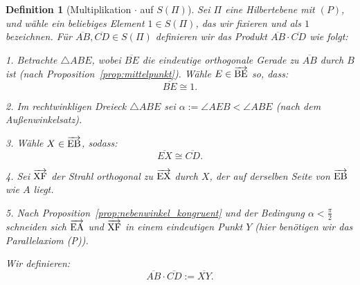 \documentclass[a4paper,12pt]{article}
\theoremstyle{break}
\newtheorem{definition}{Definition}[section]
\begin{document}
\begin{definition}[Multiplikation \(\cdot\) auf \(S(\Pi)\)]
Sei \(\Pi\) eine Hilbertebene mit \((P)\), und wähle ein beliebiges Element \(1 \in S(\Pi)\), das wir fixieren und als \(1\) bezeichnen. Für \(\overline{AB}, \overline{CD} \in S(\Pi)\) definieren wir das Produkt \(\overline{AB} \cdot \overline{CD}\) wie folgt:

1. Betrachte \(\triangle ABE\), wobei \(\overline{BE}\) die eindeutige orthogonale Gerade zu \(\overline{AB}\) durch \(B\) ist (nach Proposition~\ref{prop:mittelpunkt}). Wähle \(E \in \overrightarrow{\rm BE}\) so, dass:
   \[
   \overline{BE} \cong 1.
   \]

2. Im rechtwinkligen Dreieck \(\triangle ABE\) sei \(\alpha := \angle AEB < \angle ABE\) (nach dem Außenwinkelsatz).

3. Wähle \(X \in \overrightarrow{\rm EB}\), sodass:
   \[
   \overline{EX} \cong \overline{CD}.
   \]

4. Sei \(\overrightarrow{\rm XF}\) der Strahl orthogonal zu \(\overrightarrow{\rm EX}\) durch \(X\), der auf derselben Seite von \(\overrightarrow{\rm EB}\) wie \(A\) liegt.

5. Nach Proposition~\ref{prop:nebenwinkel_kongruent} und der Bedingung \(\alpha < \frac{\pi}{2}\) schneiden sich \(\overrightarrow{\rm EA}\) und \(\overrightarrow{\rm XF}\) in einem eindeutigen Punkt \(Y\) (hier benötigen wir das Parallelaxiom (P)).

Wir definieren:
\[
\overline{AB} \cdot \overline{CD} := \overline{XY}.
\]
\end{definition}
\end{document}
